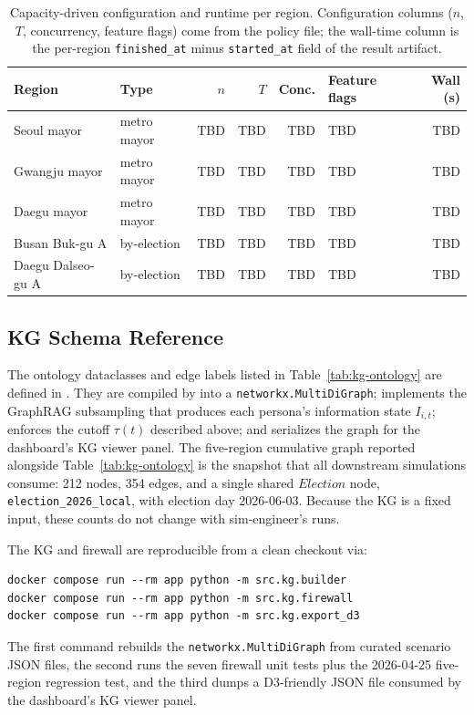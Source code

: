 \documentclass[11pt]{article}
\begin{document}
\begin{table}[h]
\centering
\caption{Capacity-driven configuration and runtime per region. Configuration columns ($n$, $T$, concurrency, feature flags) come from the policy file; the wall-time column is the per-region \texttt{finished\_at} minus \texttt{started\_at} field of the result artifact.}
\label{tab:capacity}
\small
\setlength{\tabcolsep}{3.5pt}
\begin{tabularx}{\textwidth}{Y Y r r r Y r}
\toprule
Region & Type & $n$ & $T$ & Conc. & Feature flags & Wall (s) \\
\midrule
Seoul mayor & metro mayor & TBD & TBD & TBD & TBD & TBD \\
Gwangju mayor & metro mayor & TBD & TBD & TBD & TBD & TBD \\
Daegu mayor & metro mayor & TBD & TBD & TBD & TBD & TBD \\
Busan Buk-gu A & by-election & TBD & TBD & TBD & TBD & TBD \\
Daegu Dalseo-gu A & by-election & TBD & TBD & TBD & TBD & TBD \\
\bottomrule
\end{tabularx}
\end{table}

\subsection{KG Schema Reference}
\label{app:kg-schema}

The ontology dataclasses and edge labels listed in Table~\ref{tab:kg-ontology} are defined in . They are compiled by  into a \texttt{networkx.MultiDiGraph};  implements the GraphRAG subsampling that produces each persona's information state $I_{i,t}$;  enforces the cutoff $\tau(t)$ described above; and  serializes the graph for the dashboard's KG viewer panel. The five-region cumulative graph reported alongside Table~\ref{tab:kg-ontology} is the snapshot that all downstream simulations consume: 212 nodes, 354 edges, and a single shared $Election$ node, \texttt{election\_2026\_local}, with election day 2026-06-03. Because the KG is a fixed input, these counts do not change with sim-engineer's runs.

The KG and firewall are reproducible from a clean checkout via:
\begin{verbatim}
docker compose run --rm app python -m src.kg.builder
docker compose run --rm app python -m src.kg.firewall
docker compose run --rm app python -m src.kg.export_d3
\end{verbatim}
The first command rebuilds the \texttt{networkx.MultiDiGraph} from curated scenario JSON files, the second runs the seven firewall unit tests plus the 2026-04-25 five-region regression test, and the third dumps a D3-friendly JSON file consumed by the dashboard's KG viewer panel.
\end{document}
